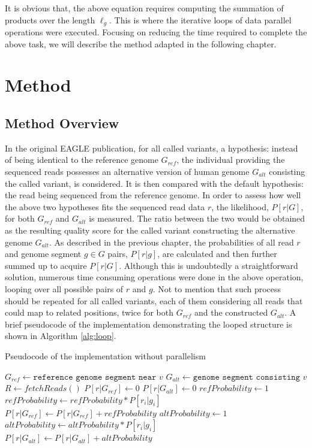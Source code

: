\documentclass{PHlab-thesis}
\begin{document}
It is obvious that, the above equation requires computing the summation of products over the length $\ell_g$. This is where the iterative loops of data parallel operations were executed. Focusing on reducing the time required to complete the above task, we will describe the method adapted in the following chapter.

\chapter{Method}
\section{Method Overview}
In the original EAGLE publication, for all called variants, a hypothesis: instead of being identical to the reference genome $G_{ref}$, the individual providing the sequenced reads possesses an alternative version of human genome $G_{alt}$ consisting the called variant, is considered. It is then compared with the default hypothesis: the read being sequenced from the reference genome. In order to assess how well the above two hypotheses fits the sequenced read data $r$, the likelihood, $P[r|G]$, for both $G_{ref}$ and $G_{alt}$ is measured. The ratio between the two would be obtained as the resulting quality score for the called variant constructing the alternative genome $G_{alt}$. As described in the previous chapter, the probabilities of all read $r$ and genome segment ${g\in G}$ pairs, $P[r|g]$, are calculated and then further summed up to acquire $P[r|G]$. Although this is undoubtedly a straightforward solution, numerous time consuming operations were done in the above operation, looping over all possible pairs of $r$ and $g$. Not to mention that such process should be repeated for all called variants, each of them considering all reads that could map to related positions, twice for both $G_{ref}$ and the constructed $G_{alt}$. A brief pseudocode of the implementation demonstrating the looped structure is shown in Algorithm \ref{alg:loop}.
\begin{algorithm}
	\caption{Pseudocode of the implementation without parallelism}
	\label{alg:loop}
	\begin{algorithmic}
		\State $G_{ref} \gets \texttt{reference genome segment near } v$
		\State $G_{alt} \gets \texttt{genome segment consisting } v$
		\State $R \gets fetchReads()$ 
			\State $P[r|G_{ref}] \gets 0$
			\State $P[r|G_{alt}] \gets 0$
				\State $refProbability \gets 1$
					\State $refProbability \gets refProbability * P[r_i|g_i]$
				\EndFor
				\State $P[r|G_{ref}] \gets P[r|G_{ref}] + refProbability$
			\EndFor
				\State $altProbability \gets 1$
					\State $altProbability \gets altProbability * P[r_i|g_i]$
				\EndFor
				\State $P[r|G_{alt}] \gets P[r|G_{alt}] + altProbability$
			\EndFor
		\EndFor
	\EndFor
	\end{algorithmic}
\end{algorithm}
\end{document}
